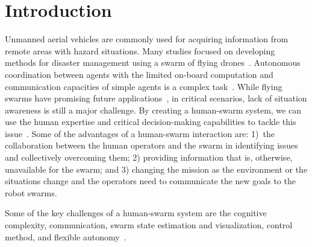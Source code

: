 \documentclass[runningheads]{llncs}%
\begin{document}
\section{Introduction}
Unmanned aerial vehicles are commonly used for acquiring information from remote areas with hazard situations. Many studies focused on developing methods for disaster management using a swarm of flying drones~\cite{innocente2019self, gkotsis2019swarm, busnel2019self}. Autonomous coordination between agents with the limited on-board computation and communication capacities of simple agents is a complex task~\cite{chung2018survey}. While flying swarms have promising future applications~\cite{st2019planetary}, in critical scenarios, lack of situation awareness is still a major challenge. 
By creating a human-swarm system, we can use the human expertise and critical decision-making capabilities to tackle this issue~\cite{ALSaamas18,ramchurn2016disaster}. Some of the advantages of a human-swarm interaction are: 1)~the collaboration between the human operators and the swarm in identifying issues and collectively overcoming them; 2) providing information that is, otherwise, unavailable for the swarm; and 3) changing the mission as the environment or the situations change and the operators need to communicate the new goals to the robot swarms. 

Some of the key challenges of a human-swarm system are the cognitive complexity, {communication}, {swarm state estimation} and {visualization}, {control method}, and flexible autonomy~\cite{kolling2015human}.
\end{document}
